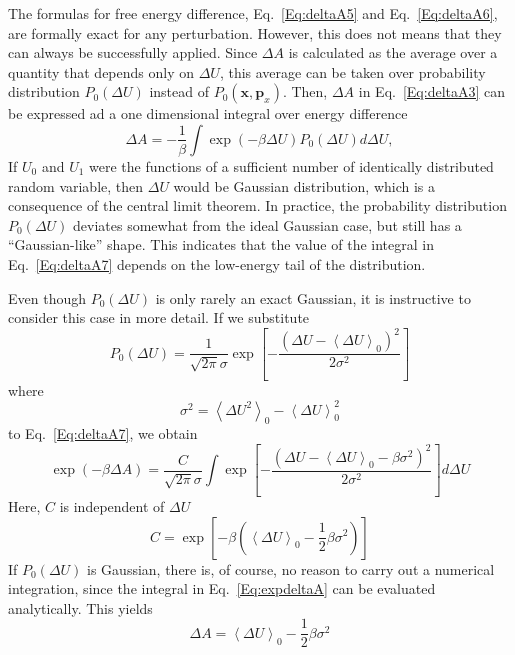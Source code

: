 The formulas for free energy difference, Eq.~\ref{Eq:deltaA5} and Eq.~\ref{Eq:deltaA6}, are formally exact for any perturbation. However, this does not means that they can always be successfully applied. Since $\Delta A$ is calculated as the average over a quantity that depends only on $\Delta U$, this average can be taken over probability distribution $P_0(\Delta U)$ instead of $P_{0}(\textbf{x},\textbf{p}_{x})$. Then, $\Delta A$ in Eq.~\ref{Eq:deltaA3} can be expressed ad a one dimensional integral over energy difference
\begin{equation}
\Delta A = -\frac{1}{\beta} \int \exp(-\beta \Delta U) P_{0}(\Delta U) d\Delta U,
\label{Eq:deltaA7}
\end{equation}
If $U_{0}$ and $U_{1}$ were the functions of a sufficient number of identically distributed random variable, then $\Delta U$ would be Gaussian distribution, which is a consequence of the central limit theorem. In practice, the probability distribution $P_{0}(\Delta U)$ deviates somewhat from the ideal Gaussian case, but still has a ``Gaussian-like'' shape. This indicates that the value of the integral in Eq.~\ref{Eq:deltaA7} depends on the low-energy tail of the distribution.

Even though $P_{0}(\Delta U)$ is only rarely an exact Gaussian, it is instructive to consider this case in more detail. If we substitute
\begin{equation}
P_{0}(\Delta U) = \frac{1}{\sqrt{2\pi}\sigma}\exp[-\frac{(\Delta U - \left \langle \Delta U \right \rangle_{0})^2}{2\sigma^2}]
\label{Eq:gaussian}
\end{equation}
where
\begin{equation}
\sigma^2 = \left \langle \Delta U^2 \right \rangle_{0} - \left \langle \Delta U \right \rangle_{0}^2
\label{Eq:variance}
\end{equation}
to Eq.~\ref{Eq:deltaA7}, we obtain
\begin{equation}
\exp(-\beta \Delta A) = \frac{C}{\sqrt{2\pi}\sigma} \int \exp[-\frac{(\Delta U - \left \langle \Delta U \right \rangle_{0} - \beta \sigma ^2)^2}{2\sigma^2}] d\Delta U
\label{Eq:expdeltaA}
\end{equation}
Here, $C$ is independent of $\Delta U$
\begin{equation}
C = \exp [-\beta (\left \langle \Delta U \right \rangle_{0} - \frac{1}{2} \beta \sigma ^2)]
\label{Eq:C}
\end{equation}
If $P_{0}(\Delta U)$ is Gaussian, there is, of course, no reason to carry out a numerical integration, since the integral in Eq.~\ref{Eq:expdeltaA} can be evaluated analytically. This yields
\begin{equation}
\Delta A = \left \langle \Delta U \right \rangle_{0} - \frac{1}{2} \beta \sigma ^2
\label{Eq:deltaA8}
\end{equation}